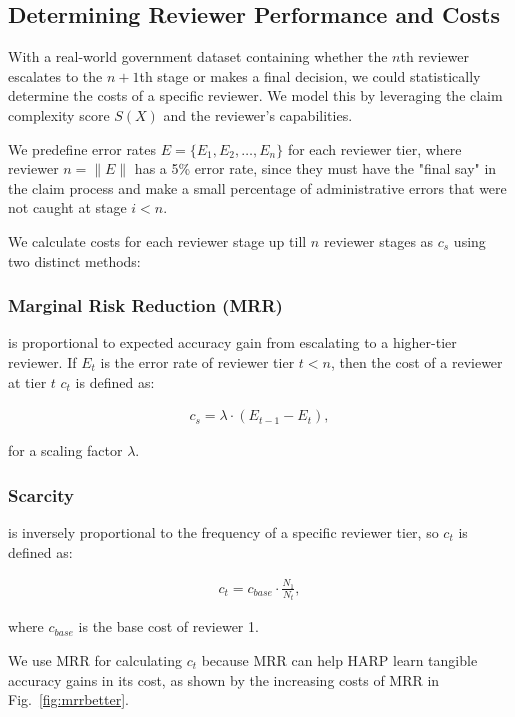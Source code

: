\documentclass[conference]{IEEEtran}
\begin{document}
\subsection{Determining Reviewer Performance and Costs \label{revcosts}}

With a real-world government dataset containing whether the $n$th reviewer escalates to the $n+1$th stage or makes a final decision,
we could statistically determine the costs of a specific reviewer. We model this by leveraging the claim complexity
score $S(X)$ and the reviewer's capabilities.

We predefine error rates $E = \{E_1, E_2, \dots, E_n\}$ for each reviewer tier, where reviewer $n = \|E\|$ has a 5\%
error rate, since they must have the "final say" in the claim process and make a small percentage of administrative errors
that were not caught at stage $i < n$. 

We calculate costs for each reviewer stage up till $n$ reviewer stages as $c_s$ using two distinct methods:

\subsubsection{Marginal Risk Reduction (MRR)} is proportional to expected accuracy gain from escalating to a 
higher-tier reviewer. If $E_t$ is the error rate of reviewer tier $t < n$, then the cost of a reviewer at tier $t$ 
$c_t$ is defined as:

\begin{align}
    c_s = \lambda \cdot (E_{t-1} - E_{t}),
\end{align}

for a scaling factor $\lambda$.

\subsubsection{Scarcity} is inversely proportional to the frequency of a specific reviewer tier, so $c_t$ is defined
as:

\begin{align}
    c_t = c_{base} \cdot \frac{N_1}{N_t},
\end{align}

where $c_{base}$ is the base cost of reviewer 1. 

We use MRR for calculating $c_t$ because MRR can help HARP learn tangible accuracy gains in its cost, 
as shown by the increasing costs of MRR in Fig.~\ref{fig:mrrbetter}.
\end{document}
